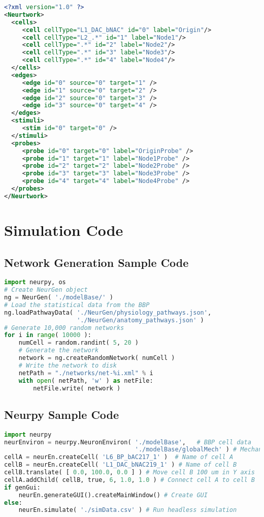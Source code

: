 \begin{lstlisting}[language=XML,label=lst:4leafTop, caption={Topology template for 4-leaf Star topology}]
<?xml version="1.0" ?>
<Neurtwork>
  <cells>
     <cell cellType="L1_DAC_bNAC" id="0" label="Origin"/>
     <cell cellType="L2_.*" id="1" label="Node1"/>
     <cell cellType=".*" id="2" label="Node2"/>
     <cell cellType=".*" id="3" label="Node3"/>
     <cell cellType=".*" id="4" label="Node4"/>
  </cells>
  <edges>
     <edge id="0" source="0" target="1" />
     <edge id="1" source="0" target="2" />
     <edge id="2" source="0" target="3" />
     <edge id="3" source="0" target="4" />
  </edges>
  <stimuli>
     <stim id="0" target="0" />
  </stimuli>
  <probes>
     <probe id="0" target="0" label="OriginProbe" />
     <probe id="1" target="1" label="Node1Probe" />
     <probe id="2" target="2" label="Node2Probe" />
     <probe id="3" target="3" label="Node3Probe" />
     <probe id="4" target="4" label="Node4Probe" />
  </probes>
</Neurtwork>
\end{lstlisting}

\section{Simulation Code}

\subsection*{Network Generation Sample Code}
\begin{lstlisting}[language=Python,label=lst:netGenSamp, caption={Sample code for the generation of unique networks using NeurGen}]
import neurpy, os
# Create NeurGen object
ng = NeurGen( './modelBase/' )
# Load the statistical data from the BBP
ng.loadPathwayData( './NeurGen/physiology_pathways.json',
                    './NeurGen/anatomy_pathways.json' )
# Generate 10,000 random networks
for i in range( 10000 ):
    numCell = random.randint( 5, 20 )
    # Generate the network
    network = ng.createRandomNetwork( numCell )
    # Write the network to disk
    netPath = "./networks/net-%i.xml" % i
    with open( netPath, 'w' ) as netFile:
        netFile.write( network )
\end{lstlisting}

\subsection*{Neurpy Sample Code}
\begin{lstlisting}[language=Python,label=lst:sampleNrpyCode, caption={Sample code for the use of the Neurpy library}]
import neurpy
neurEnviron = neurpy.NeuronEnviron( './modelBase',   # BBP cell data
                                    './modelBase/globalMech' ) # Mechanisms
cellA = neurEn.createCell( 'L6_BP_bAC217_1' )  # Name of cell A
cellB = neurEn.createCell( 'L1_DAC_bNAC219_1' ) # Name of cell B
cellB.translate( [ 0.0, 100.0, 0.0 ] ) # Move cell B 100 um in Y axis
cellA.addChild( cellB, true, 6, 1.0, 1.0 ) # Connect cell A to cell B
if genGui:
    neurEn.generateGUI().createMainWindow() # Create GUI
else:
    neurEn.simulate( './simData.csv' ) # Run headless simulation
\end{lstlisting}

